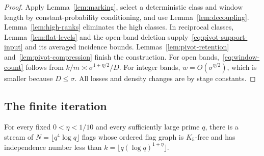 \begin{proof}
Apply Lemma~\ref{lem:marking}, select a deterministic class and window
length by constant-probability conditioning, and use
Lemma~\ref{lem:decoupling}.  Lemma~\ref{lem:high-ranks} eliminates the
high classes.  In reciprocal classes, Lemma~\ref{lem:flat-levels} and
the open-band deletion supply~\eqref{eq:pivot-support-input} and its
averaged incidence bounds.  Lemmas~\ref{lem:pivot-retention}
and~\ref{lem:pivot-compression} finish the construction.
For open bands,~\eqref{eq:window-count} follows from
$k/m\asymp\sigma^{1+\eta/2}/D$.  For integer bands,
$w=O(\sigma^{\eta/2})$, which is smaller because $D\le\sigma$.
All losses and density changes are by stage constants.
\end{proof}

\subsection{The finite iteration}

\begin{theorem}
\label{thm:stream}
For every fixed $0<\eta<1/10$ and every sufficiently large prime $q$,
there is a stream of
$N=\lfloor q^4\log q\rfloor$ flags whose ordered flag graph is
$K_5$-free and has independence number less than
$k=\lfloor q(\log q)^{1+\eta}\rfloor$.
\end{theorem}


